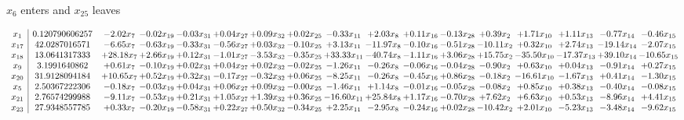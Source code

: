 \documentclass[9pt]{article}
\begin{document}
 $ x_{6} $ enters and $ x_{25} $ leaves 

 \[\begin{array}{c| c c@{\hskip 2pt} c@{\hskip 2pt} c@{\hskip 2pt} c@{\hskip 2pt} c@{\hskip 2pt} c@{\hskip 2pt} c@{\hskip 2pt} c@{\hskip 2pt} c@{\hskip 2pt} c@{\hskip 2pt} c@{\hskip 2pt} c@{\hskip 2pt} c@{\hskip 2pt} c@{\hskip 2pt} c@{\hskip 2pt} }
 x_{1}   &  0.120790606257 & -2.02 x_{7} & -0.02 x_{19} & -0.03 x_{31} & +  0.04 x_{27} & +  0.09 x_{32} & +  0.02 x_{25} & -0.33 x_{11} & +  2.03 x_{8} & +  0.11 x_{16} & -0.13 x_{28} & +  0.39 x_{2} & +  1.71 x_{10} & +  1.11 x_{13} & -0.77 x_{14} & -0.46 x_{15}\\
 x_{17}   &  42.0287016571 & -6.65 x_{7} & -0.63 x_{19} & -0.33 x_{31} & -0.56 x_{27} & +  0.03 x_{32} & -0.10 x_{25} & +  3.13 x_{11} & -11.97 x_{8} & -0.10 x_{16} & -0.51 x_{28} & -10.11 x_{2} & +  0.32 x_{10} & +  2.74 x_{13} & -19.14 x_{14} & -2.07 x_{15}\\
 x_{18}   &  13.0641317333 & + 28.18 x_{7} & +  2.66 x_{19} & +  0.12 x_{31} & -1.01 x_{27} & -3.53 x_{32} & -0.35 x_{25} & + 33.33 x_{11} & -40.74 x_{8} & -1.11 x_{16} & +  3.06 x_{28} & + 15.75 x_{2} & -35.50 x_{10} & -17.37 x_{13} & + 39.10 x_{14} & -10.65 x_{15}\\
 x_{9}   &  3.1991640862 & +  0.61 x_{7} & -0.10 x_{19} & +  0.02 x_{31} & +  0.04 x_{27} & +  0.02 x_{32} & -0.02 x_{25} & -1.26 x_{11} & -0.26 x_{8} & -0.06 x_{16} & -0.04 x_{28} & -0.90 x_{2} & +  0.63 x_{10} & +  0.04 x_{13} & -0.91 x_{14} & +  0.27 x_{15}\\
 x_{20}   &  31.9128094184 & + 10.65 x_{7} & +  0.52 x_{19} & +  0.32 x_{31} & -0.17 x_{27} & -0.32 x_{32} & +  0.06 x_{25} & -8.25 x_{11} & -0.26 x_{8} & -0.45 x_{16} & +  0.86 x_{28} & -0.18 x_{2} & -16.61 x_{10} & -1.67 x_{13} & +  0.41 x_{14} & -1.30 x_{15}\\
 x_{5}   &  2.50367222306 & -0.18 x_{7} & -0.03 x_{19} & +  0.04 x_{31} & +  0.06 x_{27} & +  0.09 x_{32} & -0.00 x_{25} & -1.46 x_{11} & +  1.14 x_{8} & -0.01 x_{16} & -0.05 x_{28} & -0.08 x_{2} & +  0.85 x_{10} & +  0.38 x_{13} & -0.40 x_{14} & -0.08 x_{15}\\
 x_{21}   &  2.76574299988 & -9.11 x_{7} & -0.53 x_{19} & +  0.21 x_{31} & +  1.05 x_{27} & +  1.39 x_{32} & +  0.36 x_{25} & -16.60 x_{11} & + 25.84 x_{8} & +  1.17 x_{16} & -0.70 x_{28} & +  7.62 x_{2} & +  6.63 x_{10} & +  0.53 x_{13} & -8.96 x_{14} & +  4.41 x_{15}\\
 x_{23}   &  27.9348557785 & +  0.33 x_{7} & -0.20 x_{19} & -0.58 x_{31} & +  0.22 x_{27} & +  0.50 x_{32} & -0.34 x_{25} & +  2.25 x_{11} & -2.95 x_{8} & -0.24 x_{16} & +  0.02 x_{28} & -10.42 x_{2} & +  2.01 x_{10} & -5.23 x_{13} & -3.48 x_{14} & -9.62 x_{15}\\

\end{array}\]
\end{document}
